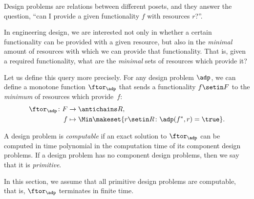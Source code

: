 
\label{sec:computation}

Design problems are relations between different posets, and they answer the question, ``can I provide a given functionality $f$ with resources $r$?''.

In engineering design, we are interested not only in whether a certain functionality can be provided with a given resource, but also in the \emph{minimal} amount of resources with which we can provide that functionality.
That is, given a required functionality, what are the \emph{minimal} sets of resources which provide it?

Let us define this query more precisely.
For any design problem $\adp$, we can define a monotone function $\ftor_\adp$ that sends a functionality $f \setin F$ to the \emph{minimum}    of resources which provide~$f$:
\begin{equation}
    \begin{aligned}
        \ftor_\adp \colon F & \to \antichains R, \\
        f                   & \mapsto \Min \makeset{ r \setin R \colon \adp(f^*, r) = \true }.
    \end{aligned}
\end{equation}

\begin{definition}\label{def:dp-computable}
    A design problem is \emph{computable} if an exact solution to $\ftor_\adp$ can be computed in time polynomial in the computation time of its component design problems.
    If a design problem has no component design problems, then we say that it is \emph{primitive}.
\end{definition}

In this section, we assume that all primitive design problems are computable, that is, $\ftor_\adp$ terminates in finite time.


